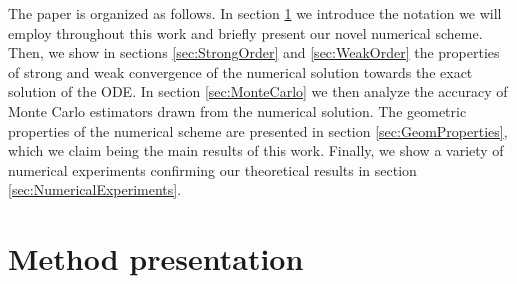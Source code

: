 \documentclass{siamart1116}
\numberwithin{theorem}{section}
\begin{document}
The paper is organized as follows. In section \ref{sec:MethodIntro} we introduce the notation we will employ throughout this work and briefly present our novel numerical scheme. Then, we show in sections \ref{sec:StrongOrder} and \ref{sec:WeakOrder} the properties of strong and weak convergence of the numerical solution towards the exact solution of the ODE. In section \ref{sec:MonteCarlo} we then analyze the accuracy of Monte Carlo estimators drawn from the numerical solution. The geometric properties of the numerical scheme are presented in section \ref{sec:GeomProperties}, which we claim being the main results of this work. Finally, we show a variety of numerical experiments confirming our theoretical results in section \ref{sec:NumericalExperiments}.

\section{Method presentation}\label{sec:MethodIntro}
\end{document}
